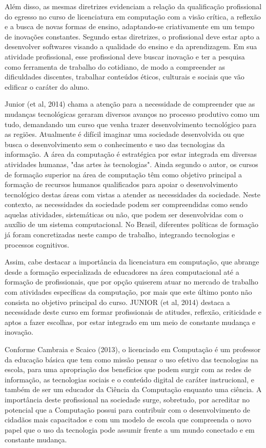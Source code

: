Além disso, as mesmas diretrizes evidenciam a relação da qualificação profissional do egresso no curso de licenciatura em computação com a visão crítica, a reflexão e a busca de novas formas de ensino, adaptando-se criativamente em um tempo de inovações constantes. Segundo estas diretrizes, o profissional deve estar apto a desenvolver softwares visando a qualidade do ensino e da aprendizagem. Em sua atividade profissional, esse profissional deve buscar inovação e ter a pesquisa como ferramenta de trabalho do cotidiano, de modo a compreender as dificuldades discentes, trabalhar conteúdos éticos, culturais e sociais que vão edificar o caráter do aluno. 

Junior (et al, 2014) chama a atenção para a necessidade de compreender que as mudanças tecnológicas geraram diversos avanços no processo produtivo como um tudo, demandando um curso que venha trazer desenvolvimento tecnológico para as regiões. Atualmente é difícil imaginar uma sociedade desenvolvida ou que busca o desenvolvimento sem o conhecimento e uso das tecnologias da informação. A área da computação é estratégica por estar integrada em diversas atividades humanas, "das artes às tecnologias". Ainda segundo o autor, os cursos de formação superior na área de computação têm como objetivo principal a formação de recursos humanos qualificados para apoiar o desenvolvimento tecnológico destas áreas com vistas a atender as necessidades da sociedade. Neste contexto, as necessidades da sociedade podem ser compreendidas como sendo aquelas atividades, sistemáticas ou não, que podem ser desenvolvidas com o auxílio de um sistema computacional. No Brasil, diferentes políticas de formação já foram concretizadas neste campo de trabalho, integrando tecnologias e processos cognitivos.

Assim, cabe destacar a importância da licenciatura em computação, que abrange desde a formação especializada de educadores na área computacional até a formação de profissionais, que por opção quiserem atuar no mercado de trabalho com atividades específicas da computação, por mais que este último ponto não consista no objetivo principal do curso. JUNIOR (et al, 2014) destaca a necessidade deste curso em formar profissionais de atitudes, reflexão, criticidade e aptos a fazer escolhas, por estar integrado em um meio de constante mudança e inovação. 


Conforme Cambraia e Scaico (2013), o licenciado em Computação é um professor da educação básica que tem como missão pensar o uso efetivo das tecnologias na escola, para uma apropriação dos benefícios que podem surgir com as redes de informação, as tecnologias sociais e o conteúdo digital de caráter instrucional, e também de ser um educador da Ciência da Computação enquanto uma ciência. A importância deste profissional na sociedade surge, sobretudo, por acreditar no potencial que a Computação possui para contribuir com o desenvolvimento de cidadãos mais capacitados e com um modelo de escola que compreenda o novo papel que o uso da tecnologia pode assumir frente a um mundo conectado e em constante mudança.


